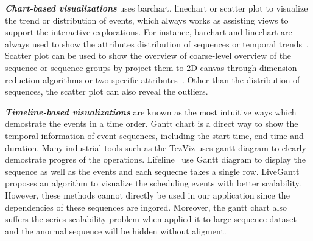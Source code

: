 \emph{\textbf{Chart-based visualizations}} uses barchart, linechart or scatter plot to visualize the trend or distribution of events, which always works as assisting views to support the interactive explorations. For instance, barchart and linechart are always used to show the attributes distribution of sequences or temporal trends~\cite{gotz2019visual, cappers2017exploring}. Scatter plot can be used to show the overview of coarse-level overview of the sequence or sequence groups by project them to 2D canvas through dimension reduction algorithms or two specific attributes~\cite{wu2020visual, malik2016high, gotz2019visual}. Other than the  distribution of sequences, the scatter plot can also reveal the outliers. 

\emph{\textbf{Timeline-based visualizations}} are known as the most intuitive ways which demostrate the events in a time order. Gantt chart is a direct way to show the temporal information of event sequences, including the start time, end time and duration. Many industrial tools such as the TezViz uses gantt diagram to clearly demostrate progres of the operations. Lifeline~\cite{plaisant1996lifelines} use Gantt diagram to display the sequence as well as the events and each sequecne takes a single row. LiveGantt~\cite{jo2014livegantt} proposes an algorithm to visualize the scheduling events with better scalability. However, these methods cannot directly be used in our application since the dependencies of these sequences are ingored. Moreover, the gantt chart also suffers the series scalability problem when applied it to large sequence dataset and the anormal sequence will be hidden without aligment.
